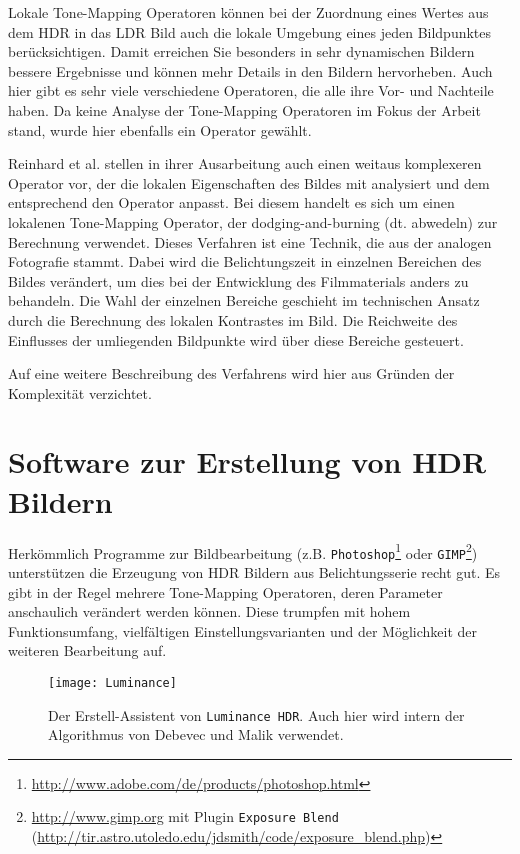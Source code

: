 Lokale \gls{Tone-Mapping} Operatoren können bei der Zuordnung eines Wertes aus dem \gls{HDR} in das \gls{LDR} Bild auch die lokale Umgebung eines jeden Bildpunktes berücksichtigen. Damit erreichen Sie besonders in sehr dynamischen Bildern bessere Ergebnisse und können mehr Details in den Bildern hervorheben. Auch hier gibt es sehr viele verschiedene Operatoren, die alle ihre Vor- und Nachteile haben. Da keine Analyse der \gls{Tone-Mapping} Operatoren im Fokus der Arbeit stand, wurde hier ebenfalls ein Operator gewählt.
 
Reinhard et al. \cite{ReinhardToneMapper} stellen in ihrer Ausarbeitung auch einen weitaus komplexeren Operator vor, der die lokalen Eigenschaften des Bildes mit analysiert und dem entsprechend den Operator anpasst. Bei diesem handelt es sich um einen lokalenen \gls{Tone-Mapping} Operator, der dodging-and-burning (dt. abwedeln) zur Berechnung verwendet. Dieses Verfahren ist eine Technik, die aus der analogen Fotografie stammt. Dabei wird die Belichtungszeit in einzelnen Bereichen des Bildes verändert, um dies bei der Entwicklung des Filmmaterials anders zu behandeln. Die Wahl der einzelnen Bereiche geschieht im technischen Ansatz durch die Berechnung des lokalen Kontrastes im Bild. Die Reichweite des Einflusses der umliegenden Bildpunkte wird über diese Bereiche gesteuert.

Auf eine weitere Beschreibung des Verfahrens wird hier aus Gründen der Komplexität verzichtet.


\section{Software zur Erstellung von HDR Bildern}
\label{sec:software}
Herkömmlich Programme zur Bildbearbeitung (z.B. \texttt{Photoshop}\footnote{\url{http://www.adobe.com/de/products/photoshop.html}} oder \texttt{GIMP}\footnote{\url{http://www.gimp.org} mit Plugin \texttt{Exposure Blend} (\url{http://tir.astro.utoledo.edu/jdsmith/code/exposure_blend.php})}) unterstützen die Erzeugung von \gls{HDR} Bildern aus Belichtungsserie recht gut. Es gibt in der Regel mehrere \gls{Tone-Mapping} Operatoren, deren Parameter anschaulich verändert werden können. Diese trumpfen mit hohem Funktionsumfang, vielfältigen Einstellungsvarianten und der Möglichkeit der weiteren Bearbeitung auf.
\begin{figure}[h]
  \begin{center}
    \texttt{[image: Luminance]}
    \caption{Der Erstell-Assistent von \texttt{Luminance HDR}. Auch hier wird intern der Algorithmus von Debevec und Malik \cite{paper} verwendet.}
    \label{fig:luminance}
  \end{center}
\end{figure}

